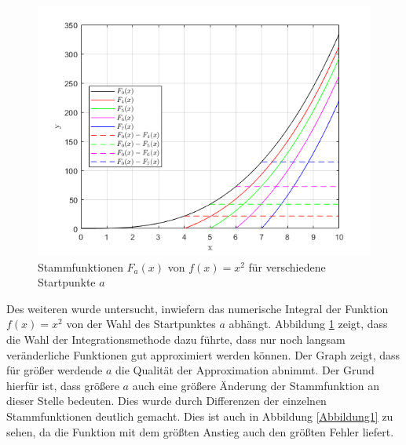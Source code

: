 \documentclass[a4paper, 10pt,onecolumn]{scrartcl}
\begin{document}
\begin{figure}[ht!]
	\centering
	\includegraphics[scale=0.5]{Fs.png}
	\caption{Stammfunktionen $F_a(x)$ von $f(x)=x^2$ für verschiedene Startpunkte $a$}
	\label{Abbildung2}
\end{figure}

Des weiteren wurde untersucht, inwiefern das numerische Integral der Funktion $f(x)=x^2$ von der Wahl des Startpunktes $a$ abhängt. Abbildung \ref{Abbildung2} zeigt, dass die Wahl der Integrationsmethode dazu führte, dass nur noch langsam veränderliche Funktionen gut approximiert werden können. Der Graph zeigt, dass für größer werdende $a$ die Qualität der Approximation abnimmt. Der Grund hierfür ist, dass größere $a$ auch eine größere Änderung der Stammfunktion an dieser Stelle bedeuten. Dies wurde durch Differenzen der einzelnen Stammfunktionen deutlich gemacht. Dies ist auch in Abbildung \ref{Abbildung1} zu sehen, da die Funktion mit dem größten Anstieg auch den größten Fehler liefert.
\end{document}
